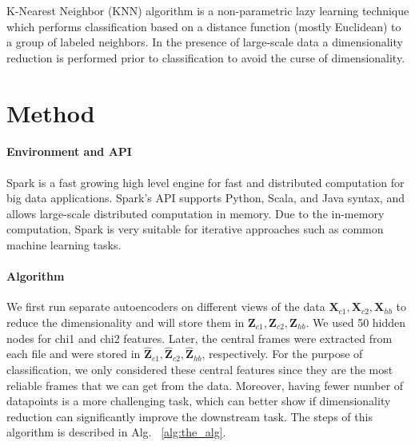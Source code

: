 \documentclass{article}
\newcommand{\mat}[1]{\mathbf{#1}}
\begin{document}
K-Nearest Neighbor (KNN) algorithm is a non-parametric lazy learning technique which performs classification based on a distance function (mostly Euclidean) to a group of labeled neighbors. In the presence of large-scale data a dimensionality reduction is performed prior to classification to avoid the curse of dimensionality.

\section{Method}
\paragraph{Environment and API} 
Spark is a fast growing high level engine for fast and distributed computation for big data applications. Spark's API supports Python, Scala, and Java syntax, and allows large-scale distributed computation in memory. Due to the in-memory computation, Spark is very suitable for iterative approaches such as common machine learning tasks. 

\paragraph{Algorithm} 
We first run separate autoencoders on different views of the data $\mat{X}_{c1}, \mat{X}_{c2}, \mat{X}_{hb}$ to reduce the dimensionality and will store them in $\mat{Z}_{c1}, \mat{Z}_{c2}, \mat{Z}_{hb}$. We used 50 hidden nodes for chi1 and chi2 features. Later, the central frames were extracted from each file and were stored in $\mat{\hat{Z}}_{c1}, \mat{\hat{Z}}_{c2}, \mat{\hat{Z}}_{hb}$, respectively. For the purpose of classification, we only considered these central features since they are the most reliable frames that we can get from the data. Moreover, having fewer number of datapoints is a more challenging task, which can better show if dimensionality reduction can significantly improve the downstream task. The steps of this algorithm is described in Alg. ~\ref{alg:the_alg}.
\end{document}
